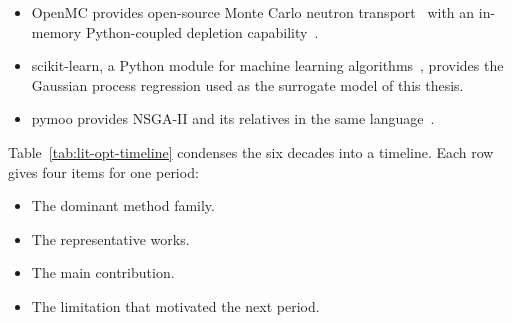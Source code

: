 \begin{itemize}
  \item OpenMC provides open-source Monte Carlo neutron
        transport~\cite{romano_openmc_2015} with an in-memory
        Python-coupled depletion capability~\cite{romano_2021_depletion}.

  \item scikit-learn, a Python module for machine learning
        algorithms~\cite{pedregosa_sklearn_2011}, provides the Gaussian
        process regression used as the surrogate model of this thesis.

  \item pymoo provides NSGA-II and its relatives in the same
        language~\cite{blank_deb_2020}.
\end{itemize}

Table~\ref{tab:lit-opt-timeline} condenses the six decades into a
timeline. Each row gives four items for one period:

\begin{itemize}
  \item The dominant method family.

  \item The representative works.

  \item The main contribution.

  \item The limitation that motivated the next period.
\end{itemize}

